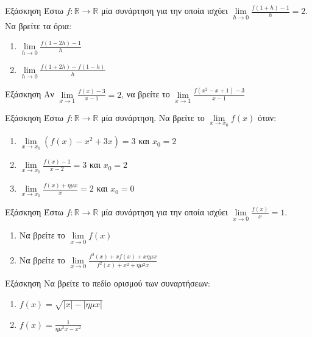 \documentclass[greek]{beamer}
\begin{document}
\begin{frame}{Εξάσκηση}
  Έστω $f:\mathbb{R}\to\mathbb{R}$ μία συνάρτηση για την οποία ισχύει $\lim\limits_{h \to 0}{ \frac{f(1+h)-1}{h} }=2$. Να βρείτε τα όρια:
  \begin{enumerate}
    \item $\lim\limits_{h \to 0}{ \frac{f(1-2h)-1}{h} }$ \pause
    \item $\lim\limits_{h \to 0}{ \frac{f(1+2h)-f(1-h)}{h} }$
  \end{enumerate}
\end{frame}

\begin{frame}{Εξάσκηση}
  Αν $\lim\limits_{x \to 1}{ \frac{f(x)-3}{x-1} }=2$, να βρείτε το $\lim\limits_{x \to 1}{ \frac{f(x^2-x+1)-3}{x-1} }$
\end{frame}

\begin{frame}{Εξάσκηση}
  Έστω $f:\mathbb{R}\to\mathbb{R}$ μία συνάρτηση. Να βρείτε το $\lim\limits_{x \to x_0}{ f(x) }$ όταν:
  \begin{enumerate}
    \item $\lim\limits_{x \to x_0}{\left(f(x)-x^2+3x  \right)=3  }$ και $x_0=2$ \pause
    \item $\lim\limits_{x \to x_0}{\frac{f(x)-1}{x-2}=3  }$ και $x_0=2$ \pause
    \item $\lim\limits_{x \to x_0}{\frac{f(x)+ημx}{x}=2  }$ και $x_0=0$
  \end{enumerate}
\end{frame}

\begin{frame}{Εξάσκηση}
  Έστω $f:\mathbb{R}\to\mathbb{R}$ μία συνάρτηση για την οποία ισχύει $\lim\limits_{x \to 0}{ \frac{f(x)}{x} }=1$.
  \begin{enumerate}
    \item Να βρείτε το $\lim\limits_{x \to 0}{f(x)}$ \pause
    \item Να βρείτε το $\lim\limits_{x \to 0}{\frac{f^2(x)+xf(x)+xημx}{f^2(x)+x^2+ημ^2x}}$
  \end{enumerate}
\end{frame}

\begin{frame}{Εξάσκηση}
  Να βρείτε το πεδίο ορισμού των συναρτήσεων:
  \begin{enumerate}
    \item $f(x)=\sqrt{|x|-|ημx|}$ \pause
    \item $f(x)=\frac{1}{ημ^2x-x^2}$
  \end{enumerate}
\end{frame}
\end{document}
